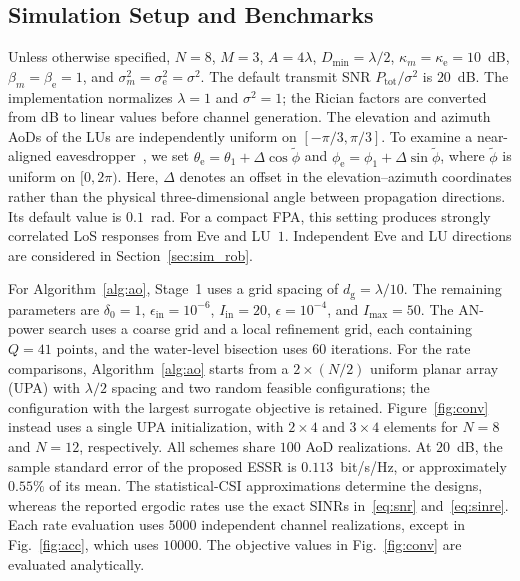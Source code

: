 \documentclass[journal]{IEEEtran}
\newcommand{\Ptot}{P_{\mathrm{tot}}}
\newcommand{\Dmin}{D_{\mathrm{min}}}
\begin{document}
\subsection{Simulation Setup and Benchmarks}\label{sec:sim_setup}

Unless otherwise specified, $N=8$, $M=3$, $A=4\lambda$, $\Dmin=\lambda/2$, $\kappa_m=\kappa_{\mathrm{e}}=10$~dB, $\beta_m=\beta_{\mathrm{e}}=1$, and $\sigma_m^2=\sigma_{\mathrm{e}}^2=\sigma^2$. The default transmit SNR $\Ptot/\sigma^2$ is $20$~dB. The implementation normalizes $\lambda=1$ and $\sigma^2=1$; the Rician factors are converted from dB to linear values before channel generation. The elevation and azimuth AoDs of the LUs are independently uniform on $[-\pi/3,\pi/3]$. To examine a near-aligned eavesdropper~\cite{ChenArxiv2026}, we set $\theta_{\mathrm{e}}=\theta_1+\Delta\cos\tilde\phi$ and $\phi_{\mathrm{e}}=\phi_1+\Delta\sin\tilde\phi$, where $\tilde\phi$ is uniform on $[0,2\pi)$. Here, $\Delta$ denotes an offset in the elevation--azimuth coordinates rather than the physical three-dimensional angle between propagation directions. Its default value is $0.1$~rad. For a compact FPA, this setting produces strongly correlated LoS responses from Eve and LU~$1$. Independent Eve and LU directions are considered in Section~\ref{sec:sim_rob}.

For Algorithm~\ref{alg:ao}, Stage~1 uses a grid spacing of $d_{\mathrm g}=\lambda/10$. The remaining parameters are $\delta_0=1$, $\epsilon_{\mathrm{in}}=10^{-6}$, $I_{\mathrm{in}}=20$, $\epsilon=10^{-4}$, and $I_{\mathrm{max}}=50$. The AN-power search uses a coarse grid and a local refinement grid, each containing $Q=41$ points, and the water-level bisection uses $60$ iterations. For the rate comparisons, Algorithm~\ref{alg:ao} starts from a $2\times(N/2)$ uniform planar array (UPA) with $\lambda/2$ spacing and two random feasible configurations; the configuration with the largest surrogate objective is retained. Figure~\ref{fig:conv} instead uses a single UPA initialization, with $2\times4$ and $3\times4$ elements for $N=8$ and $N=12$, respectively. All schemes share $100$ AoD realizations. At $20$~dB, the sample standard error of the proposed ESSR is $0.113$~bit/s/Hz, or approximately $0.55\%$ of its mean. The statistical-CSI approximations determine the designs, whereas the reported ergodic rates use the exact SINRs in~\eqref{eq:snr} and~\eqref{eq:sinre}. Each rate evaluation uses $5000$ independent channel realizations, except in Fig.~\ref{fig:acc}, which uses $10000$. The objective values in Fig.~\ref{fig:conv} are evaluated analytically.
\end{document}
